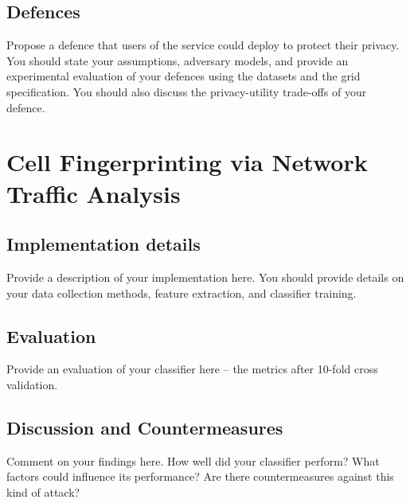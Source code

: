 \documentclass[10pt,conference,compsocconf]{IEEEtran}
\begin{document}
\subsection{Defences}
Propose a defence that users of the service could deploy to protect their privacy.  You
should state your assumptions, adversary models, and provide an experimental evaluation of your
defences using the datasets and the grid specification. You should also discuss the
privacy-utility trade-offs of your defence.

\section{Cell Fingerprinting via Network Traffic Analysis}

\subsection{Implementation details}
Provide a description of your implementation here. You should provide details on your data collection methods, feature extraction, and classifier training.

\subsection{Evaluation}
Provide an evaluation of your classifier here -- the metrics after 10-fold cross validation.

\subsection{Discussion and Countermeasures}
Comment on your findings here. How well did your classifier perform? What factors could influence its performance? Are there countermeasures against this kind of attack?



\end{document}
